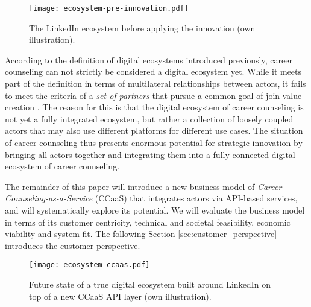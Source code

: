  \begin{figure}[h!]
    \centering
    \texttt{[image: ecosystem-pre-innovation.pdf]}
    \caption{The LinkedIn ecosystem before applying the innovation (own illustration).}
    \label{fig:ecosystem}
\end{figure}

According to the definition of digital ecosystems introduced previously, career counseling can not strictly be considered
a digital ecosystem yet. While it meets part of the definition in terms of multilateral relationships between actors, it
fails to meet the criteria of a \textit{set of partners} that pursue a common goal of join value creation \citep{adnerEcosystemStructureActionable2017}.
The reason for this is that the digital ecosystem of career counseling is not yet a fully integrated ecosystem, but rather
a collection of loosely coupled actors that may also use different platforms for different use cases. The situation of 
career counseling thus presents enormous potential for strategic innovation by bringing all actors together and integrating
them into a fully connected digital ecosystem of career counseling.

The remainder of this paper will introduce a new business model of \textit{Career-Counseling-as-a-Service} (CCaaS) that
integrates actors via API-based services, and will systematically explore its potential. We will evaluate the business
model in terms of its customer centricity, technical and societal feasibility, economic viability and system fit. The
following Section \ref{sec:customer_perspective} introduces the customer perspective.


\begin{figure}[h!]
    \centering
    \texttt{[image: ecosystem-ccaas.pdf]}
    \caption{Future state of a true digital ecosystem built around LinkedIn on top of a new CCaaS API layer (own illustration).}
    \label{fig:ecosystem-ccaas}
\end{figure}